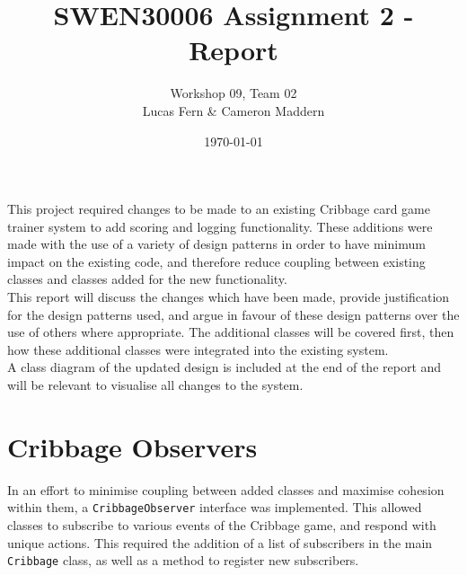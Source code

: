 \documentclass{article}
\title{SWEN30006 Assignment 2 - Report}
\date{\today}
\author{Workshop 09, Team 02\\Lucas Fern \& Cameron Maddern}
\begin{document}
\maketitle
This project required changes to be made to an existing Cribbage card game trainer system to add scoring and logging functionality. These additions were made with the use of a variety of design patterns in order to have minimum impact on the existing code, and therefore reduce coupling between existing classes and classes added for the new functionality.\\[2mm]
This report will discuss the changes which have been made, provide justification for the design patterns used, and argue in favour of these design patterns over the use of others where appropriate. The additional classes will be covered first, then how these additional classes were integrated into the existing system.\\[2mm]
A class diagram of the updated design is included at the end of the report and will be relevant to visualise all changes to the system. 

\section{Cribbage Observers}
In an effort to minimise coupling between added classes and maximise cohesion within them, a \verb|CribbageObserver| interface was implemented. This allowed classes to subscribe to various events of the Cribbage game, and respond with unique actions. This required the addition of a list of subscribers in the main \verb|Cribbage| class, as well as a method to register new subscribers.
\end{document}
